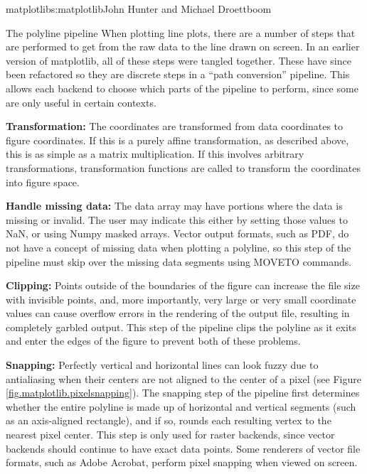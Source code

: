 \begin{aosachapter}{matplotlib}{s:matplotlib}{John Hunter and Michael Droettboom}
\begin{aosasect1}{The polyline pipeline}
When plotting line plots, there are a number of steps that are
performed to get from the raw data to the line drawn on screen.  In an
earlier version of matplotlib, all of these steps were tangled
together.  These have since been refactored so they are discrete steps
in a ``path conversion'' pipeline.  This allows each backend to choose
which parts of the pipeline to perform, since some are only useful in
certain contexts.

\begin{aosaenumerate}

\item \textbf{Transformation:} The coordinates are transformed from data
  coordinates to figure coordinates.  If this is a purely affine
  transformation, as described above, this is as simple as a matrix
  multiplication.  If this involves arbitrary transformations,
  transformation functions are called to transform the coordinates
  into figure space.

\item \textbf{Handle missing data:} The data array may have portions
  where the data is missing or invalid.  The user may indicate this
  either by setting those values to NaN, or using Numpy masked arrays.
  Vector output formats, such as PDF, do not have a concept of missing
  data when plotting a polyline, so this step of the pipeline must
  skip over the missing data segments using MOVETO commands.

\item \textbf{Clipping:} Points outside of the boundaries of the
  figure can increase the file size with invisible points, and, more
  importantly, very large or very small coordinate values can cause
  overflow errors in the rendering of the output file, resulting in
  completely garbled output.  This step of the pipeline clips the
  polyline as it exits and enter the edges of the figure to prevent
  both of these problems.

\item \textbf{Snapping:} Perfectly vertical and horizontal lines can
  look fuzzy due to antialiasing when their centers are not aligned to
  the center of a pixel (see Figure
  \ref{fig.matplotlib.pixelsnapping}).  The snapping step of the
  pipeline first determines whether the entire polyline is made up of
  horizontal and vertical segments (such as an axis-aligned
  rectangle), and if so, rounds each resulting vertex to the nearest
  pixel center.  This step is only used for raster backends, since
  vector backends should continue to have exact data points.  Some
  renderers of vector file formats, such as Adobe Acrobat, perform
  pixel snapping when viewed on screen.


\end{aosaenumerate}
\end{aosasect1}
\end{aosachapter}
